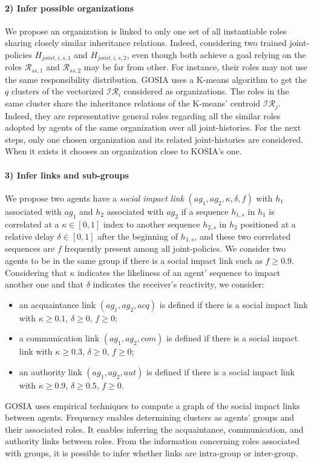 \documentclass[doubleblind]{ecai}
\newcounter{relation}
\begin{document}
\paragraph{2) Infer possible organizations}

We propose an organization is linked to only one set of all instantiable roles sharing closely similar inheritance relations. Indeed, considering two trained joint-policies $H_{joint,i,s,1}$ and $H_{joint,i,s,2}$, even though both achieve a goal relying on the roles $\mathcal{R}_{ss,1}$ and $\mathcal{R}_{ss,2}$ may be far from other. For instance, their roles may not use the same responsibility distribution.
GOSIA uses a K-means algorithm to get the $q$ clusters of the vectorized $\mathcal{IR}_{i}$ considered as organizations. The roles in the same cluster share the inheritance relations of the K-means' centroid $\mathcal{IR}_j$. Indeed, they are representative general roles regarding all the similar roles adopted by agents of the same organization over all joint-histories.
For the next steps, only one chosen organization and its related joint-histories are considered. When it exists it chooses an organization close to KOSIA's one.

\paragraph{3) Infer links and sub-groups}

We propose two agents have a \emph{social impact link} $(ag_1,ag_2, \kappa, \delta, f)$ with $h_1$ associated with $ag_1$ and $h_2$ associated with $ag_2$ if a sequence $h_{1,s}$ in $h_1$ is correlated at a $\kappa \in [0,1]$ index to another sequence $h_{2,s}$ in $h_2$ positioned at a relative delay $\delta \in [0,1]$ after the beginning of $h_{1,s}$, and these two correlated sequences are $f$ frequently present among all joint-policies.
We consider two agents to be in the same group if there is a social impact link such as $f \geq 0.9$. Considering that $\kappa$ indicates the likeliness of an agent' sequence to impact another one and that $\delta$ indicates the receiver's reactivity, we consider:
\begin{itemize}
    \item an acquaintance link $(ag_1,ag_2,acq)$ is defined if there is a social impact link with $\kappa \geq 0.1$, $\delta \geq 0$, $f \geq 0$;
    \item a communication link $(ag_1,ag_2,com)$ is defined if there is a social impact link with $\kappa \geq 0.3$, $\delta \geq 0$, $f \geq 0$;
    \item an authority link $(ag_1,ag_2,aut)$ is defined if there is a social impact link with $\kappa \geq 0.9$, $\delta \geq 0.5$, $f \geq 0$.
\end{itemize}
GOSIA uses empirical techniques to compute a graph of the social impact links between agents. Frequency enables determining clusters as agents' groups and their associated roles. It enables inferring the acquaintance, communication, and authority links between roles. From the information concerning roles associated with groups, it is possible to infer whether links are intra-group or inter-group.
\end{document}

